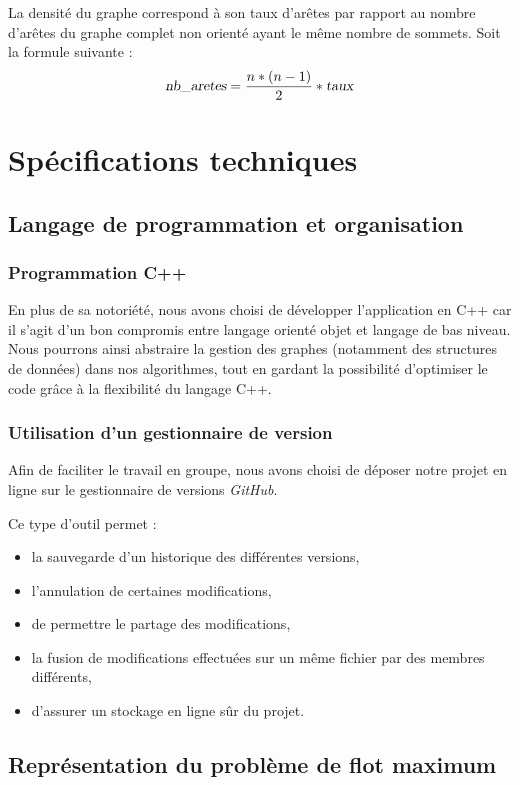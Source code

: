 La densité du graphe correspond à son taux d'arêtes par rapport au nombre d'arêtes du graphe complet non orienté ayant le même nombre de sommets. Soit la formule suivante :
\[ \textsl{nb\_aretes} = \frac{n*(n-1)}{2}*\textsl{taux}\]

\section{Spécifications techniques}

\subsection{Langage de programmation et organisation}

\subsubsection{Programmation C++}
En plus de sa notoriété, nous avons choisi de développer l'application en C++ car il s'agit d'un bon compromis entre langage orienté objet et langage de bas niveau. Nous pourrons ainsi abstraire la gestion des graphes (notamment des structures de données) dans nos algorithmes, tout en gardant la possibilité d'optimiser le code grâce à la flexibilité du langage C++.

\subsubsection{Utilisation d'un gestionnaire de version}
Afin de faciliter le travail en groupe, nous avons choisi de déposer notre projet en ligne sur le gestionnaire de versions \emph{GitHub}. 

Ce type d'outil permet :
\begin{itemize}
\item la sauvegarde d'un historique des différentes versions,
\item l'annulation de certaines modifications,
\item de permettre le partage des modifications,
\item la fusion de modifications effectuées sur un même fichier par des membres différents,
\item d'assurer un stockage en ligne sûr du projet.
\end{itemize}

\subsection{Représentation du problème de flot maximum}

